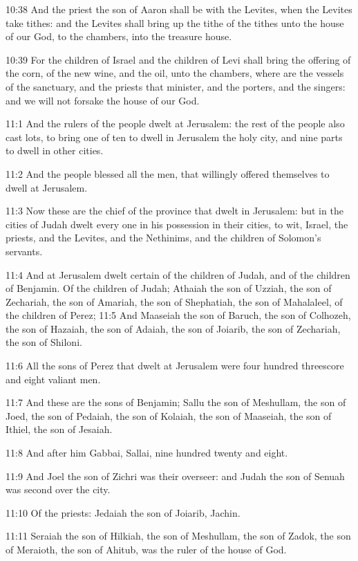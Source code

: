 10:38 And the priest the son of Aaron shall be with the Levites, when the Levites take tithes: and the Levites shall bring up the tithe of the tithes unto the house of our God, to the chambers, into the treasure house.

10:39 For the children of Israel and the children of Levi shall bring the offering of the corn, of the new wine, and the oil, unto the chambers, where are the vessels of the sanctuary, and the priests that minister, and the porters, and the singers: and we will not forsake the house of our God.

11:1 And the rulers of the people dwelt at Jerusalem: the rest of the people also cast lots, to bring one of ten to dwell in Jerusalem the holy city, and nine parts to dwell in other cities.

11:2 And the people blessed all the men, that willingly offered themselves to dwell at Jerusalem.

11:3 Now these are the chief of the province that dwelt in Jerusalem: but in the cities of Judah dwelt every one in his possession in their cities, to wit, Israel, the priests, and the Levites, and the Nethinims, and the children of Solomon's servants.

11:4 And at Jerusalem dwelt certain of the children of Judah, and of the children of Benjamin. Of the children of Judah; Athaiah the son of Uzziah, the son of Zechariah, the son of Amariah, the son of Shephatiah, the son of Mahalaleel, of the children of Perez; 11:5 And Maaseiah the son of Baruch, the son of Colhozeh, the son of Hazaiah, the son of Adaiah, the son of Joiarib, the son of Zechariah, the son of Shiloni.

11:6 All the sons of Perez that dwelt at Jerusalem were four hundred threescore and eight valiant men.

11:7 And these are the sons of Benjamin; Sallu the son of Meshullam, the son of Joed, the son of Pedaiah, the son of Kolaiah, the son of Maaseiah, the son of Ithiel, the son of Jesaiah.

11:8 And after him Gabbai, Sallai, nine hundred twenty and eight.

11:9 And Joel the son of Zichri was their overseer: and Judah the son of Senuah was second over the city.

11:10 Of the priests: Jedaiah the son of Joiarib, Jachin.

11:11 Seraiah the son of Hilkiah, the son of Meshullam, the son of Zadok, the son of Meraioth, the son of Ahitub, was the ruler of the house of God.


